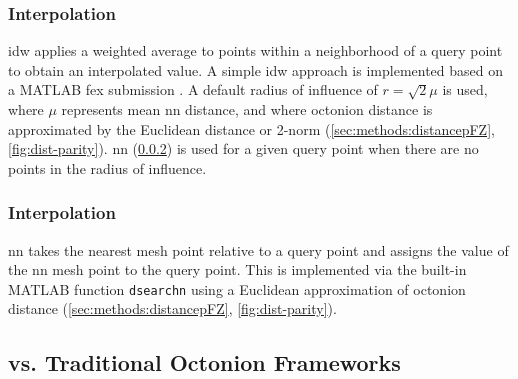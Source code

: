 \documentclass[preprint,12pt]{elsarticle}
\begin{document}
\subsubsection{ Interpolation}
\label{sec:methods:interp:idw}


\Gls{idw} applies a weighted average to points within a neighborhood of a query point to obtain an interpolated value. A simple \gls{idw} approach is implemented based on a MATLAB \gls{fex} submission \cite{tovarInverseDistanceWeight2020}. A default radius of influence of $r=\sqrt{2} \mu$ is used, where $\mu$ represents mean \gls{nn} distance, and where octonion distance is approximated by the Euclidean distance or 2-norm (\cref{sec:methods:distancepFZ}, \cref{fig:dist-parity}). \gls{nn} (\cref{sec:methods:interp:nn}) is used for a given query point when there are no points in the radius of influence.

\subsubsection{ Interpolation}
\label{sec:methods:interp:nn}


\Gls{nn} takes the nearest mesh point relative to a query point and assigns the value of the \gls{nn} mesh point to the query point. This is implemented via the built-in MATLAB function \texttt{dsearchn} using a Euclidean approximation of octonion distance (\cref{sec:methods:distancepFZ}, \cref{fig:dist-parity}).

\subsection{ vs. Traditional Octonion Frameworks} \label{sec:methods:closed-mesh-comparison}
\end{document}
